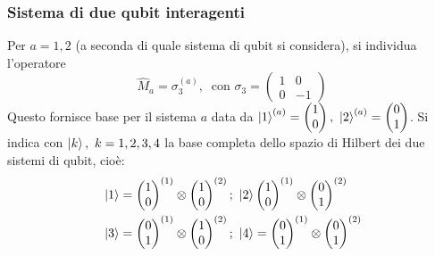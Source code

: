\documentclass[11pt, a4paper]{scrartcl} %
\numberwithin{equation}{subsection}
\theoremstyle{style2}
\theoremstyle{style1}
\begin{document}
\subsubsection{Sistema di due qubit interagenti}
Per $a = 1, 2$ (a seconda di quale sistema di qubit si considera), si individua l'operatore 
\[
	\hat{M}_a = \sigma _3 ^{(a)} , \ \text{ con } \sigma _3 = \begin{pmatrix} 1 & 0 \\ 0 &-1 \end{pmatrix} 
\] 
Questo fornisce base per il sistema $a$ data da $\ket{1} ^{(a)} = \begin{pmatrix} 1 \\0  \end{pmatrix}, \  \ket{2} ^{(a)} = \begin{pmatrix} 0 \\ 1 \end{pmatrix} $.
Si indica con $\ket{k}, \ k=1,2,3,4  $ la base completa dello spazio di Hilbert dei due sistemi di qubit, cio\`e:
\begin{equation}
	\begin{split}
		&\ket{1} =\begin{pmatrix} 1 \\0 \end{pmatrix}^{(1)}  \otimes \begin{pmatrix} 1 \\ 0 \end{pmatrix} ^{(2)} ; \ \ket{2} \begin{pmatrix} 1 \\0  \end{pmatrix}^{(1)} \otimes \begin{pmatrix} 0\\ 1 \end{pmatrix} ^{(2)} \\
		& \ket{3}  = \begin{pmatrix} 0 \\ 1 \end{pmatrix} ^{(1)} \otimes \begin{pmatrix} 1 \\ 0 \end{pmatrix} ^{(2)} ; \ \ket{4} = \begin{pmatrix} 0 \\ 1  \end{pmatrix} ^{(1)} \otimes \begin{pmatrix} 0\\ 1 \end{pmatrix} ^{(2)} 
	\end{split}
\end{equation}
\end{document}

